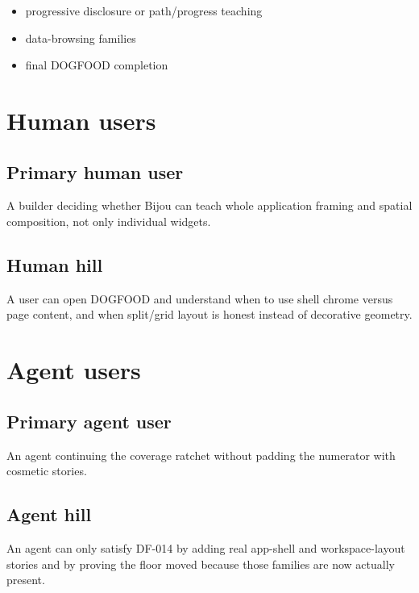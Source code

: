 \begin{itemize}
\tightlist
\item
  progressive disclosure or path/progress teaching
\item
  data-browsing families
\item
  final DOGFOOD completion
\end{itemize}

\section{Human users}\label{record-076-human-users}

\subsection{Primary human user}\label{record-076-primary-human-user}

A builder deciding whether Bijou can teach whole application framing and spatial composition, not only individual widgets.

\subsection{Human hill}\label{record-076-human-hill}

A user can open DOGFOOD and understand when to use shell chrome versus page content, and when split/grid layout is honest instead of decorative geometry.

\section{Agent users}\label{record-076-agent-users}

\subsection{Primary agent user}\label{record-076-primary-agent-user}

An agent continuing the coverage ratchet without padding the numerator with cosmetic stories.

\subsection{Agent hill}\label{record-076-agent-hill}

An agent can only satisfy DF-014 by adding real app-shell and workspace-layout stories and by proving the floor moved because those families are now actually present.

